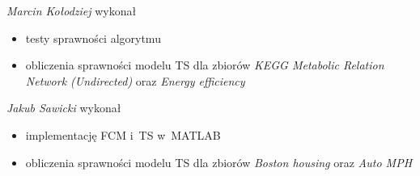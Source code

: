 \documentclass[a4paper; 11pt]{article}
\begin{document}
\emph{Marcin Kołodziej} wykonał
\begin{itemize}
\item testy sprawności algorytmu
\item obliczenia sprawności modelu TS dla zbiorów \emph{KEGG Metabolic Relation Network (Undirected)} oraz \emph{Energy efficiency}
\end{itemize}

\emph{Jakub Sawicki} wykonał
\begin{itemize}
\item implementację FCM i~TS w~MATLAB
\item obliczenia sprawności modelu TS dla zbiorów \emph{Boston housing} oraz \emph{Auto MPH}
\end{itemize}
\end{document}
